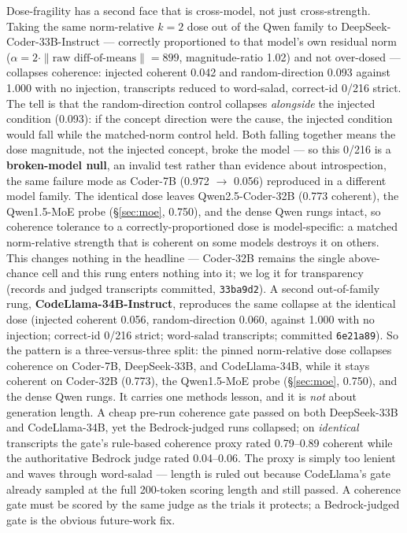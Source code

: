 \documentclass[11pt]{article}
\begin{document}
Dose-fragility has a second face that is cross-model, not just cross-strength. Taking the same norm-relative $k = 2$ dose out of the Qwen family to DeepSeek-Coder-33B-Instruct --- correctly proportioned to that model's own residual norm ($\alpha = 2 \cdot \|\text{raw diff-of-means}\| = 899$, magnitude-ratio 1.02) and not over-dosed --- collapses coherence: injected coherent 0.042 and random-direction 0.093 against 1.000 with no injection, transcripts reduced to word-salad, correct-id 0/216 strict. The tell is that the random-direction control collapses \emph{alongside} the injected condition (0.093): if the concept direction were the cause, the injected condition would fall while the matched-norm control held. Both falling together means the dose magnitude, not the injected concept, broke the model --- so this 0/216 is a \textbf{broken-model null}, an invalid test rather than evidence about introspection, the same failure mode as Coder-7B (0.972 $\to$ 0.056) reproduced in a different model family. The identical dose leaves Qwen2.5-Coder-32B (0.773 coherent), the Qwen1.5-MoE probe (\S\ref{sec:moe}, 0.750), and the dense Qwen rungs intact, so coherence tolerance to a correctly-proportioned dose is model-specific: a matched norm-relative strength that is coherent on some models destroys it on others. This changes nothing in the headline --- Coder-32B remains the single above-chance cell and this rung enters nothing into it; we log it for transparency (records and judged transcripts committed, \texttt{33ba9d2}). A second out-of-family rung, \textbf{CodeLlama-34B-Instruct}, reproduces the same collapse at the identical dose (injected coherent 0.056, random-direction 0.060, against 1.000 with no injection; correct-id 0/216 strict; word-salad transcripts; committed \texttt{6e21a89}). So the pattern is a three-versus-three split: the pinned norm-relative dose collapses coherence on Coder-7B, DeepSeek-33B, and CodeLlama-34B, while it stays coherent on Coder-32B (0.773), the Qwen1.5-MoE probe (\S\ref{sec:moe}, 0.750), and the dense Qwen rungs. It carries one methods lesson, and it is \emph{not} about generation length. A cheap pre-run coherence gate passed on both DeepSeek-33B and CodeLlama-34B, yet the Bedrock-judged runs collapsed; on \emph{identical} transcripts the gate's rule-based coherence proxy rated 0.79--0.89 coherent while the authoritative Bedrock judge rated 0.04--0.06. The proxy is simply too lenient and waves through word-salad --- length is ruled out because CodeLlama's gate already sampled at the full 200-token scoring length and still passed. A coherence gate must be scored by the same judge as the trials it protects; a Bedrock-judged gate is the obvious future-work fix.
\end{document}
